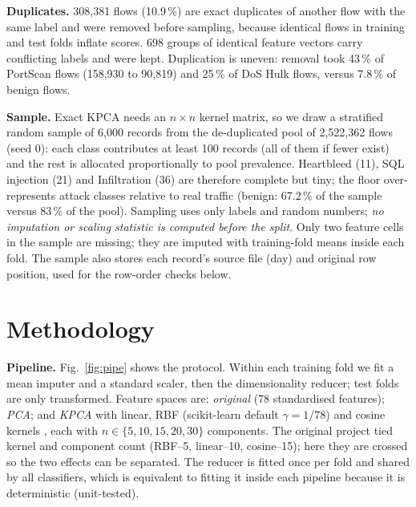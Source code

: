 \documentclass[conference]{IEEEtran}
\newcommand{\tabsize}{\footnotesize}
\begin{document}
\textbf{Duplicates.} 308{,}381 flows (10.9\,\%) are exact duplicates of another flow with the same label and were removed before sampling, because identical flows in training and test folds inflate scores. 698 groups of identical feature vectors carry conflicting labels and were kept. Duplication is uneven: removal took 43\,\% of PortScan flows (158{,}930 to 90{,}819) and 25\,\% of DoS Hulk flows, versus 7.8\,\% of benign flows.

\textbf{Sample.} Exact KPCA needs an $n\times n$ kernel matrix, so we draw a stratified random sample of 6{,}000 records from the de-duplicated pool of 2{,}522{,}362 flows (seed 0): each class contributes at least 100 records (all of them if fewer exist) and the rest is allocated proportionally to pool prevalence. Heartbleed (11), SQL injection (21) and Infiltration (36) are therefore complete but tiny; the floor over-represents attack classes relative to real traffic (benign: 67.2\,\% of the sample versus 83\,\% of the pool). Sampling uses only labels and random numbers; \emph{no imputation or scaling statistic is computed before the split}. Only two feature cells in the sample are missing; they are imputed with training-fold means inside each fold. The sample also stores each record's source file (day) and original row position, used for the row-order checks below.

\begin{table}[t]
\caption{Class distribution of the 6{,}000-record sample.}\label{tab:classes}
\centering\tabsize

\end{table}

\section{Methodology}\label{sec:method}
\textbf{Pipeline.} Fig.~\ref{fig:pipe} shows the protocol. Within each training fold we fit a mean imputer and a standard scaler, then the dimensionality reducer; test folds are only transformed. Feature spaces are: \emph{original} (78 standardised features); \emph{PCA}; and \emph{KPCA} with linear, RBF (scikit-learn default $\gamma=1/78$) and cosine kernels \cite{scholkopf1998}, each with $n\in\{5,10,15,20,30\}$ components. The original project tied kernel and component count (RBF--5, linear--10, cosine--15); here they are crossed so the two effects can be separated. The reducer is fitted once per fold and shared by all classifiers, which is equivalent to fitting it inside each pipeline because it is deterministic (unit-tested).
\end{document}
